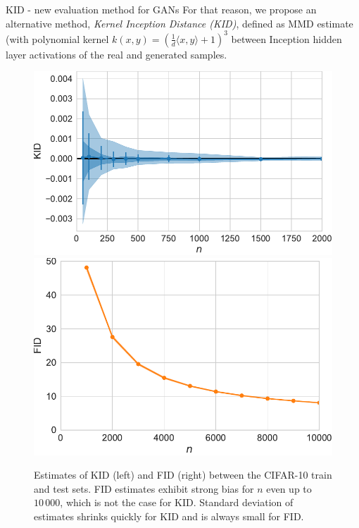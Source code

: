 \documentclass[xcolor={table}]{beamer}
\begin{document}
\begin{frame}{}
\begin{columns}[T, totalwidth=\textwidth]
\begin{column}{.32\textwidth}
\begin{block}{KID - new evaluation method for GANs}
      For that reason, we propose an alternative method, \emph{Kernel Inception Distance (KID)}, defined as 
      MMD estimate (with polynomial kernel $k(x,y) = \left(\frac{1}{d}\langle x, y\rangle + 1\right)^3$
      between Inception hidden layer activations of the real and generated samples. 
    \end{block}
    \begin{figure}
      \centering
      \includegraphics[width=.48\columnwidth]{figs/mmd-unbiased.pdf}\quad
      \includegraphics[width=.48\columnwidth]{figs/fid-bias.pdf}
      \caption{Estimates of KID (left) and FID (right) between the CIFAR-10 train and test sets. FID estimates 
        exhibit strong bias for $n$ even up to $10\,000$, which is not the case for KID. 
        Standard deviation of estimates shrinks quickly for KID and is always small for FID.}  %
    \label{fig:fid-kid-bias}
\end{figure}

     \printbibliography
  \end{column}

\end{columns}


\end{frame}
\end{document}
